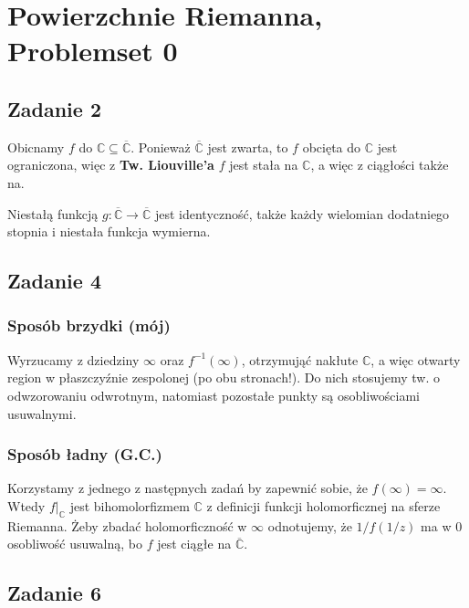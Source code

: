 \chapter{Powierzchnie Riemanna, Problemset 0}


\section*{Zadanie 2}

Obicnamy \( f \) do \( \mathbb{C} \subseteq \overline{ \mathbb{C} } \). Ponieważ \( \overline{ \mathbb{C} } \) jest zwarta, to \( f \) obcięta do \( \mathbb{C} \) jest ograniczona, więc z \textbf{Tw. Liouville'a} \( f \) jest stała na \( \mathbb{C} \), a więc z ciągłości także na.

Niestałą funkcją \( g: \overline{ \mathbb{C} } \to \overline{ \mathbb{C} } \) jest identyczność, także każdy wielomian dodatniego stopnia i niestała funkcja wymierna.

\section*{Zadanie 4}

\subsection*{Sposób brzydki (mój)}

Wyrzucamy z dziedziny \( \infty \) oraz \( f^{-1}(\infty) \), otrzymująć nakłute \( \mathbb{C} \), a więc otwarty region w płaszczyźnie zespolonej (po obu stronach!). Do nich stosujemy tw. o odwzorowaniu odwrotnym, natomiast pozostałe punkty są osobliwościami usuwalnymi.

\subsection*{Sposób ładny (G.C.)}

Korzystamy z jednego z następnych zadań by zapewnić sobie, że \( f(\infty) = \infty \). Wtedy \( f|_\mathbb{C} \) jest bihomolorfizmem \( \mathbb{C} \) z definicji funkcji holomorficznej na sferze Riemanna. Żeby zbadać holomorficzność w \( \infty \) odnotujemy, że \( 1/f(1/z) \) ma w \( 0 \) osobliwość usuwalną, bo \( f \) jest ciągłe na \( \overline{\mathbb{C}} \).

\section*{Zadanie 6}

